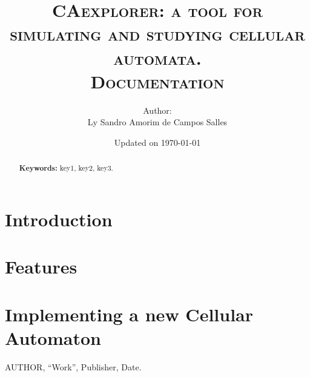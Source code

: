 \documentclass[12pt,a4paper,final]{article}
\title{\textsc{CAexplorer: a tool for simulating and studying cellular automata.\\Documentation}}
\author{Author:\\Ly Sandro Amorim de Campos Salles}
\date{Updated on \today}
\begin{document}
	\maketitle
	\begin{abstract}
		\lipsum[1]
		\vspace{2mm}
		\textbf{Keywords: } key1, key2, key3.
	\end{abstract}

\section{Introduction}
	\lipsum[2]

\section{Features}
	\lipsum[3]

\section{Implementing a new Cellular Automaton}
	\lipsum[4]

\begin{thebibliography}{99}
 AUTHOR, ``Work'', Publisher, Date.
\end{thebibliography}
\end{document}
